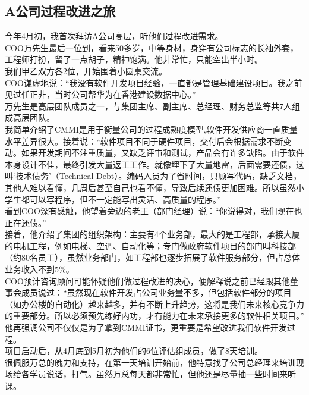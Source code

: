 \hypertarget{aux516cux53f8ux8fc7ux7a0bux6539ux8fdbux4e4bux65c5}{%
\subsection{A公司过程改进之旅}\label{aux516cux53f8ux8fc7ux7a0bux6539ux8fdbux4e4bux65c5}}

今年4月初，我首次拜访A公司高层，听他们过程改进需求。\\
COO万先生最后一位到，看来50多岁，中等身材，身穿有公司标志的长袖外套，工程师打扮，留了一点胡子，精神饱满。他非常忙，只能空出半小时。\\
我们甲乙双方各2位，开始围着小圆桌交流。\\
COO谦虚地说：``我没有软件开发项目经验，一直都是管理基础建设项目。我之前见过任正非，当时公司帮华为在香港建设数据中心。''\\
万先生是高层团队成员之一，与集团主席、副主席、总经理、财务总监等共7人组成高层团队。\\
我简单介绍了CMMI是用于衡量公司的过程成熟度模型,软件开发供应商一直质量水平差异很大。接着说：``软件项目不同于硬件项目，交付后会根据需求不断变动。如果开发期间不注重质量，又缺乏评审和测试，产品会有许多缺陷。由于软件本身设计不佳，最终引发大量返工工作。就像埋下了大量地雷，后面需要还债，这叫`技术债务'（Technical
Debt）。编码人员为了省时间，只顾写代码，缺乏文档，其他人难以看懂，几周后甚至自己也看不懂，导致后续还债更加困难。所以虽然小学生都可以写程序，但不一定能写出灵活、高质量的程序。''\\
看到COO深有感触，他望着旁边的老王（部门经理）说：``你说得对，我们现在也正在还债。''\\
接着，他介绍了集团的组织架构：主要有4个业务部，最大的是工程部，承接大厦的电机工程，例如电梯、空调、自动化等；专门做政府软件项目的部门叫科技部（约80名员工），虽然业务部门，如工程部也逐步拓展了软件服务部分，但占总体业务收入不到5\%。\\
COO预计咨询顾问可能怀疑他们做过程改进的决心，便解释说之前已经跟其他董事会成员说过：``虽然现在软件开发占公司业务量不多，但包括软件部分的项目（如办公楼的自动化）越来越多，并有不断上升趋势，这将是我们未来核心竞争力的重要部分。所以必须预先练好内功，才有能力在未来承接更多的软件相关项目。''\\
他再强调公司不仅仅是为了拿到CMMI证书，更重要是希望改进我们软件开发过程。\\
项目启动后，从4月底到5月初为他们的6位评估组成员，做了8天培训。\\
很佩服万总的魄力和支持，在第一天培训开始前，他特意找了公司总经理来培训现场给各学员说话，打气。虽然万总每天都非常忙，但他还是尽量抽一些时间来听课。\\
